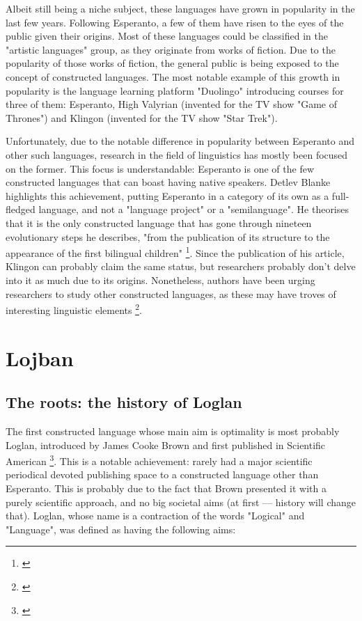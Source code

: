 \vspace{-0.05cm}
Albeit still being a niche subject, these languages have grown in popularity in the last few years. Following Esperanto, a few of them have risen to the eyes of the public
given their origins. Most of these languages could be classified in the "artistic languages" group, as they originate from works of fiction. Due to the popularity of those works of
fiction, the general public is being exposed to the concept of constructed languages. The most notable example of this growth in popularity is the language learning platform
"Duolingo" introducing courses for three of them: Esperanto, High Valyrian (invented for the TV show "Game of Thrones") and Klingon (invented for the TV show "Star Trek"). \newline

\vspace{-0.05cm}
Unfortunately, due to the notable difference in popularity between Esperanto and other such languages, research in the field of linguistics has mostly been focused on the former.
This focus is understandable: Esperanto is one of the few constructed languages that can boast having native speakers. Detlev Blanke highlights this achievement, putting Esperanto
in a category of its own as a full-fledged language, and not a "language project" or a "semilanguage". He theorises that it is the only constructed language that has gone through nineteen
evolutionary steps he describes, "from the publication of its structure to the appearance of the first bilingual children" \footnote{\cite{blanke1989planned}}.
Since the publication of his article, Klingon can probably claim the same status, but researchers probably don't delve into it as much due to its origins.
Nonetheless, authors have been urging researchers to study other constructed languages, as these may have troves of interesting linguistic elements \footnote{\cite{oostendorp2001constructed}}.

\section{Lojban}

\subsection{The roots: the history of Loglan}

The first constructed language whose main aim is optimality is most probably Loglan, introduced by James Cooke Brown and first published
in Scientific American \footnote{\cite{brown1960loglan}}. This is a notable achievement: rarely had a major scientific periodical devoted publishing
space to a constructed language other than Esperanto. This is probably due to the fact that Brown presented it with a purely scientific approach, and no big societal aims
(at first --- history will change that). Loglan, whose name is a contraction of the words "Logical" and "Language", was defined as having the following aims:

